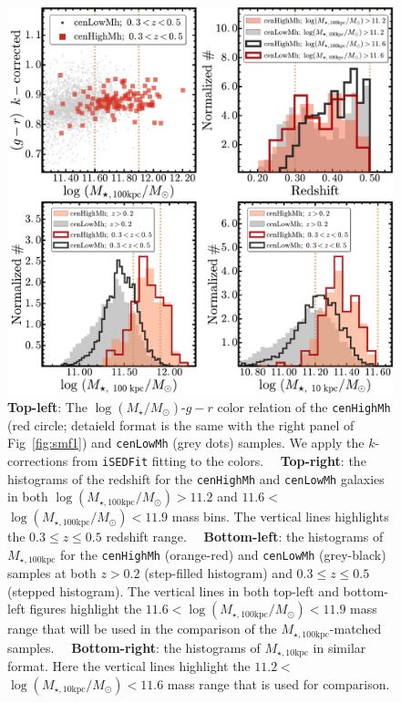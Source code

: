 \documentclass{emulateapj}
\def\rbcg{\texttt{cenHighMh}}
\def\nbcg{\texttt{cenLowMh}}
\def\logms{{$\log (M_{\star}/M_{\odot})$}}
\def\minn{{$M_{\star,10\mathrm{kpc}}$}}
\def\mtot{{$M_{\star,100\mathrm{kpc}}$}}
\def\logminn{{$\log (M_{\star,10\mathrm{kpc}}/M_{\odot})$}}
\def\logmtot{{$\log (M_{\star,100\mathrm{kpc}}/M_{\odot})$}}
\begin{document}
\begin{CJK*}{UTF8}{gbsn}
  \begin{figure}[t!]
      \centering 
      \includegraphics[width=16.5cm]{fig/redbcg_sample_stats}
      \caption{
          \textbf{Top-left}: The \logms{}-$g-r$ color relation of the \rbcg{} 
          (red circle; detaield format is the same with the right panel of 
          Fig~\ref{fig:smf1}) and \nbcg{} (grey dots) samples.
          We apply the $k$-corrections from \texttt{iSEDFit} fitting to the colors.~~          
          \textbf{Top-right}: the histograms of the redshift for the \rbcg{} and 
          \nbcg{} galaxies in both \logmtot$>11.2$ and $11.6<$\logmtot{}$<11.9$
          mass bins.
          The vertical lines highlights the $0.3\leq z \leq 0.5$ redshift range.~~
          \textbf{Bottom-left}: the histograms of \mtot{} for the \rbcg{} (orange-red) 
          and \nbcg{} (grey-black) samples at both $z>0.2$ (step-filled histogram) and 
          $0.3 \leq z \leq 0.5$ (stepped histogram). 
          The vertical lines in both top-left and bottom-left figures highlight the 
          $11.6<$\logmtot{}$<11.9$ mass range that will be used in the comparison of 
          the \mtot{}-matched samples.~~
          \textbf{Bottom-right}: the histograms of \minn{} in similar format. 
          Here the vertical lines highlight the 
          $11.2<$\logminn{}$<11.6$ mass range that is used for comparison.
      }
      \label{fig:sample_stats}
  \end{figure}
    

\end{CJK*}
\end{document}

